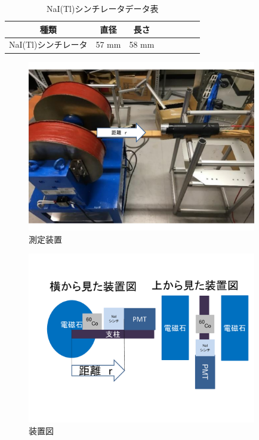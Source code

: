 \begin{table}[htb]
	\begin{center}
	
	  \begin{tabular}{|c|c|c|c|c|c|c|c|} \hline
		種類& 直径 & 長さ  \\ \hline \hline
		NaI(Tl)シンチレータ & 57 mm & 58 mm \\ \hline
	\end{tabular}
	  \caption{NaI(Tl)シンチレータデータ表}
	\end{center}
\end{table}

\begin{figure}[H]
	\centering
		\includegraphics[width=10cm]{fig/iguchi/2inchsokutei.pdf}
	\caption{測定装置}
	\label{2inchsokutei}
\end{figure}

\begin{figure}[H]
	\centering
		\includegraphics[width=10cm]{fig/iguchi/soutizu1.pdf}
	\caption{装置図}
	\label{soutizu1}
\end{figure}

